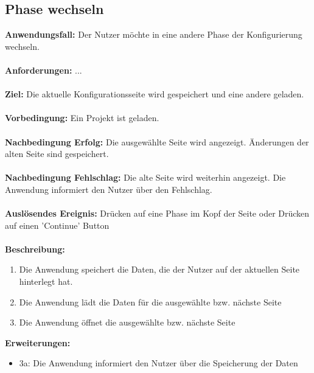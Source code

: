 \documentclass[parskip=full]{scrartcl} %
\begin{document}
\subsection*{Phase wechseln}
\textbf{Anwendungsfall:} Der Nutzer möchte in eine andere Phase der Konfigurierung wechseln.\\\\
\textbf{Anforderungen:} ...\\\\
\textbf{Ziel:} Die aktuelle Konfigurationsseite wird gespeichert und eine andere geladen. \\\\
\textbf{Vorbedingung:} Ein Projekt ist geladen. \\\\
\textbf{Nachbedingung Erfolg:} Die ausgewählte Seite wird angezeigt. Änderungen der alten Seite sind gespeichert.\\\\
\textbf{Nachbedingung Fehlschlag:} Die alte Seite wird weiterhin angezeigt. Die Anwendung informiert den Nutzer über den Fehlschlag. \\\\
\textbf{Auslösendes Ereignis:} Drücken auf eine Phase im Kopf der Seite oder Drücken auf einen 'Continue' Button \\\\
\textbf{Beschreibung:}
\begin{enumerate}
    \item Die Anwendung speichert die Daten, die der Nutzer auf der aktuellen Seite hinterlegt hat.
    \item Die Anwendung lädt die Daten für die ausgewählte bzw. nächste Seite
    \item Die Anwendung öffnet die ausgewählte bzw. nächste Seite
\end{enumerate}
\textbf{Erweiterungen:} 
\begin{itemize}
    \item 3a: Die Anwendung informiert den Nutzer über die Speicherung der Daten
\end{itemize}
\newpage
\end{document}
